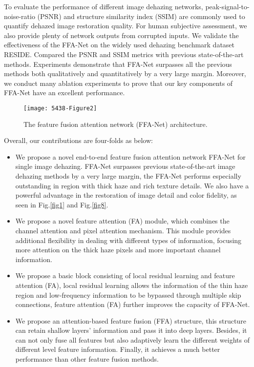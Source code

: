 \documentclass[letterpaper]{article} \usepackage{aaai20}  \usepackage{times}  \usepackage{helvet} \usepackage{courier}  \usepackage[hyphens]{url}  \usepackage{graphicx} \urlstyle{rm} \def\UrlFont{\rm}  \usepackage{graphicx}  \frenchspacing  \setlength{\pdfpagewidth}{8.5in}  \setlength{\pdfpageheight}{11in}  \usepackage{bm}
\begin{document}
To evaluate the performance of different image dehazing networks, peak-signal-to-noise-ratio (PSNR) and structure similarity index (SSIM) are commonly used to quantify dehazed image restoration quality. For human subjective assessment, we also provide plenty of network outputs from corrupted inputs. We validate the effectiveness of the FFA-Net on the widely used dehazing benchmark dataset RESIDE\cite{RESIDEbenchmarking}. Compared the PSNR and SSIM metrics with previous state-of-the-art methods. Experiments demonstrate that FFA-Net surpasses all the previous methods both qualitatively and quantitatively by a very large margin. Moreover, we conduct many ablation experiments to prove that our key components of FFA-Net have an excellent performance.


\begin{figure*}[t]
	
	\centering
	\texttt{[image: 5438-Figure2]} \caption{The feature fusion attention network (FFA-Net) architecture.}
	\label{fig2}
	
\end{figure*}


Overall, our contributions are four-folds as below:
\begin{itemize}
\item We propose a novel end-to-end feature fusion attention network FFA-Net for single image dehazing. FFA-Net surpasses previous state-of-the-art image dehazing methods by a very large margin, the FFA-Net performs especially outstanding in region with thick haze and rich texture details. We also have a powerful advantage in  the restoration of image detail and color fidelity, as seen in Fig.\ref{fig1} and Fig.\ref{fig8}.

\item We propose a novel feature attention (FA) module, which combines the channel attention and pixel attention mechanism. This module
provides additional flexibility in dealing with different types of information, focusing more attention on the thick haze pixels and more important channel information. 

\item We propose a basic block consisting of local residual learning  and feature attention (FA), local residual learning allows the information of the thin haze region and low-frequency information to be bypassed through multiple skip connections, feature attention (FA) further improves the capacity of FFA-Net.

\item We propose an attention-based feature fusion (FFA) structure, this structure can retain shallow layers' information and pass it into deep layers.  Besides, it can not only fuse  all features but also adaptively learn the different weights of different level feature information. Finally, it achieves a much better performance than other feature fusion methods.

\end{itemize}
\end{document}
